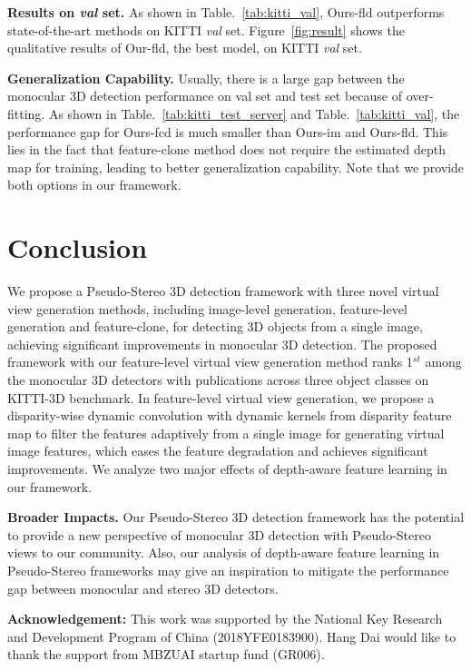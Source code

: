 \documentclass[10pt,twocolumn,letterpaper]{article}
\begin{document}
\noindent\textbf{Results on \emph{val} set.} As shown in Table.~\ref{tab:kitti_val}, Ours-fld outperforms state-of-the-art methods on KITTI \emph{val} set. Figure~\ref{fig:result} shows the qualitative results of Our-fld, the best model, on KITTI \emph{val} set.

\noindent\textbf{Generalization Capability.} Usually, there is a large gap between the monocular 3D detection performance on val set and test set because of over-fitting. As shown in Table.~\ref{tab:kitti_test_server} and Table.~\ref{tab:kitti_val}, the performance gap for Ours-fcd is much smaller than Ours-im and Ours-fld. This lies in the fact that feature-clone method does not require the estimated depth map for training, leading to better generalization capability. Note that we provide both options in our framework.







\section{Conclusion}
We propose a Pseudo-Stereo 3D detection framework with three novel virtual view generation methods, including image-level generation, feature-level generation and feature-clone, for detecting 3D objects from a single image, achieving significant improvements in monocular 3D detection. The proposed framework with our feature-level virtual view generation method ranks 1$^{st}$ among the monocular 3D detectors with publications across three object classes on KITTI-3D benchmark. In feature-level virtual view generation, we propose a disparity-wise dynamic convolution with dynamic kernels from disparity feature map to filter the features adaptively from a single image for generating virtual image features, which eases the feature degradation and achieves significant improvements.
We analyze two major effects of depth-aware feature learning in our framework. 

\noindent\textbf{Broader Impacts.} Our Pseudo-Stereo 3D detection framework has the potential to provide a new perspective of monocular 3D detection with Pseudo-Stereo views to our community. Also, our analysis of depth-aware feature learning in Pseudo-Stereo frameworks may give an inspiration to mitigate the performance gap between monocular and stereo 3D detectors.   

\textbf{Acknowledgement:} This work was supported by
the National Key Research and Development Program of
China (2018YFE0183900). Hang Dai would like to thank
the support from MBZUAI startup fund (GR006).

{\small


}
\end{document}
